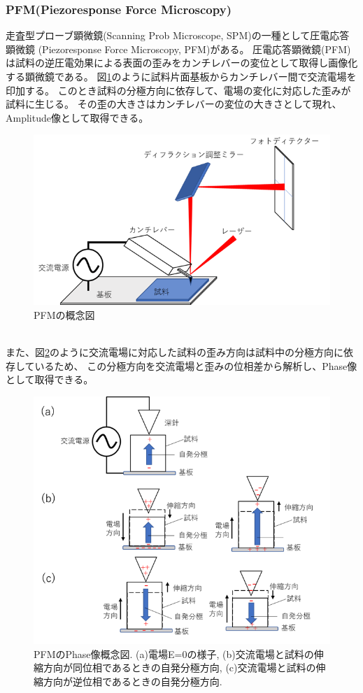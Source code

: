 \documentclass[dvipdfmx,12pt,a4paper]{jreport}
\begin{document}
		\subsubsection{PFM(Piezoresponse Force Microscopy)}
		走査型プローブ顕微鏡(Scanning Prob Microscope, SPM)の一種として圧電応答顕微鏡
		(Piezoresponse Force Microscopy, PFM)がある。
		圧電応答顕微鏡(PFM)は試料の逆圧電効果による表面の歪みをカンチレバーの変位として取得し画像化する顕微鏡である。
		図\ref{PFMの概念図}のように試料片面基板からカンチレバー間で交流電場を印加する。
		このとき試料の分極方向に依存して、電場の変化に対応した歪みが試料に生じる。
		その歪の大きさはカンチレバーの変位の大きさとして現れ、
		Amplitude像として取得できる。
		\begin{figure}[h]
			\centering
			\includegraphics{PFM.png}
			\caption{PFMの概念図}
			\label{PFMの概念図}
		\end{figure}
		\\
		また、図\ref{PFM_phaseの概念図}のように交流電場に対応した試料の歪み方向は試料中の分極方向に依存しているため、
		この分極方向を交流電場と歪みの位相差から解析し、Phase像として取得できる。
		\begin{figure}[h]
			\centering
			\includegraphics[width=0.8\linewidth]{PFM_phase.png}
			\caption{PFMのPhase像概念図. (a)電場E=0の様子,
			(b)交流電場と試料の伸縮方向が同位相であるときの自発分極方向, 
			(c)交流電場と試料の伸縮方向が逆位相であるときの自発分極方向.}
			\label{PFM_phaseの概念図}
		\end{figure}
\end{document}
